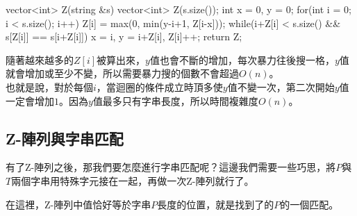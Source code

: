 \begin{C++}
vector<int> Z(string &s){
    vector<int> Z(s.size());
    int x = 0, y = 0;
    for(int i = 0; i < s.size(); i++){
        Z[i] = max(0, min(y-i+1, Z[i-x]));
        while(i+Z[i] < s.size() && s[Z[i]] == s[i+Z[i]])
            x = i, y = i+Z[i], Z[i]++;
    }
    return Z;
}
\end{C++}

隨著越來越多的$Z[i]$被算出來，$y$值也會不斷的增加，每次暴力往後搜一格，$y$值就會增加或至少不變，所以需要暴力搜的個數不會超過$O(n)$。\\

也就是說，對於每個$i$，當迴圈的條件成立時頂多使$y$值不變一次，第二次開始$y$值一定會增加$1$。因為$y$值最多只有字串長度，所以時間複雜度$O(n)$。

\subsection{Z-陣列與字串匹配}

有了Z-陣列之後，那我們要怎麼進行字串匹配呢？這邊我們需要一些巧思，將$P$與$T$兩個字串用特殊字元接在一起，再做一次Z-陣列就行了。

\begin{center}
\end{center}

在這裡，Z-陣列中值恰好等於字串$P$長度的位置，就是找到了的$P$的一個匹配。

